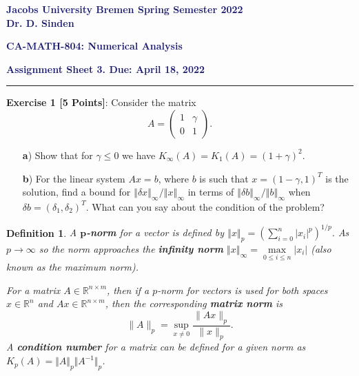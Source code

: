 \documentclass{article}
\newtheorem*{definition-non}{Definition}
\begin{document}
\noindent\textsf{\textbf{\textcolor{MidnightBlue}{Jacobs University Bremen \hfill Spring Semester 2022}}}\\

\noindent{}\textsf{\textbf{\textcolor{MidnightBlue}{Dr. D. Sinden}}}\\

\begin{center}
{\Large \textbf{\textsf{\textcolor{MidnightBlue}{CA-MATH-804: Numerical Analysis}}}}
\end{center}

\begin{flushright}
\textbf{\textsf{\textcolor{MidnightBlue}{Assignment Sheet 3. Due: April 18, 2022}}}
\end{flushright}

\begin{center}
\textcolor{MidnightBlue}{\rule[0.5\baselineskip]{1.0cm}{0.4pt}}
\end{center}

\noindent\textsf{\textbf{Exercise 1 [5 Points]}}: Consider the matrix
\begin{equation}
A = \left( \begin{array}{cc}
1 & \gamma \\
0 & 1
\end{array}
\right) . \nonumber
\end{equation}
\begin{itemize}
\item[\textsf{\textbf{a})}] Show that for ${\gamma \le 0}$ we have ${K_{\infty}(A) = K_1(A) = \left(1+\gamma\right)^{2}}$. 
\item[\textsf{\textbf{b})}] For the linear system $Ax = b$, where $b$ is such that $x=\left( 1 - \gamma, 1 \right)^T$ is the solution, find a bound for $\left\Vert \delta x \right\Vert_{\infty}\slash \left\Vert x \right\Vert_{\infty}$ in terms of $\left\Vert \delta b \right\Vert_{\infty}\slash \left\Vert b \right\Vert_{\infty}$ when $\delta b = \left( \delta_1, \delta_2 \right)^T$. What can you say about the condition of the problem?
\end{itemize}
\noindent

\begin{definition-non}
A $\boldsymbol{p}$\textbf{-norm} for a vector is defined by $\left\Vert x \right\Vert_p = \left( \sum\limits_{i=0}^{n} \left| x_i \right|^p \right)^{1\slash p}$. As $p \rightarrow\infty$ so the norm approaches the \textbf{infinity norm} $\left\Vert x \right\Vert_\infty = \max\limits_{0\le i \le n} \left| x_i \right|$ (also known as the maximum norm).

For a matrix $A \in \mathbb{R}^{n \times m}$, then if a $p$-norm for vectors is used for both spaces $x \in \mathbb{R}^{n}$ and $Ax \in \mathbb{R}^{n \times m}$, then the corresponding \textbf{matrix norm} is
\begin{equation}
\| A \|_{p} = \sup \limits_{x\neq 0} \dfrac{ \| A x \|_p }{\| x \|_p}. \nonumber
\end{equation}
A \textbf{condition number} for a matrix can be defined for a given norm as $K_p \left(A\right) = \bigl\Vert A \bigr \Vert_p \bigl\Vert A^{-1} \bigr \Vert_p$.
\end{definition-non}
\end{document}
